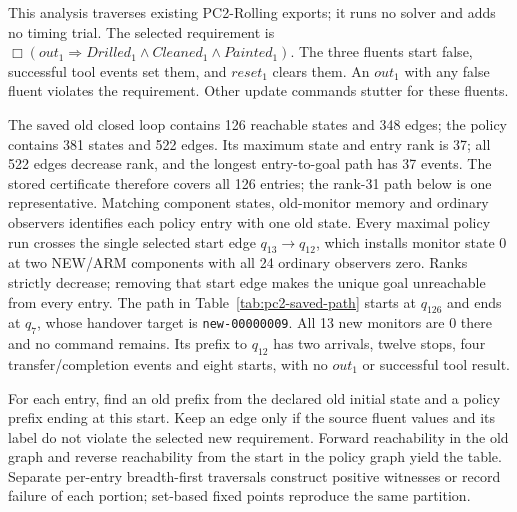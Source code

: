 This analysis traverses existing PC2-Rolling exports; it runs no solver and adds no timing trial. The selected requirement is $\Box(out_1\Rightarrow Drilled_1\land Cleaned_1\land Painted_1)$. The three fluents start false, successful tool events set them, and $reset_1$ clears them. An $out_1$ with any false fluent violates the requirement. Other update commands stutter for these fluents.

The saved old closed loop contains 126 reachable states and 348 edges; the policy contains 381 states and 522 edges. Its maximum state and entry rank is 37; all 522 edges decrease rank, and the longest entry-to-goal path has 37 events. The stored certificate therefore covers all 126 entries; the rank-31 path below is one representative. Matching component states, old-monitor memory and ordinary observers identifies each policy entry with one old state. Every maximal policy run crosses the single selected start edge $q_{13}\to q_{12}$, which installs monitor state 0 at two NEW/ARM components with all 24 ordinary observers zero. Ranks strictly decrease; removing that start edge makes the unique goal unreachable from every entry.
The path in Table~\ref{tab:pc2-saved-path} starts at $q_{126}$ and ends at $q_7$, whose handover target is \texttt{new-00000009}. All 13 new monitors are 0 there and no command remains. Its prefix to $q_{12}$ has two arrivals, twelve stops, four transfer/completion events and eight starts, with no $out_1$ or successful tool result.

For each entry, find an old prefix from the declared old initial state and a policy prefix ending at this start. Keep an edge only if the source fluent values and its label do not violate the selected new requirement. Forward reachability in the old graph and reverse reachability from the start in the policy graph yield the table. Separate per-entry breadth-first traversals construct positive witnesses or record failure of each portion; set-based fixed points reproduce the same partition.

